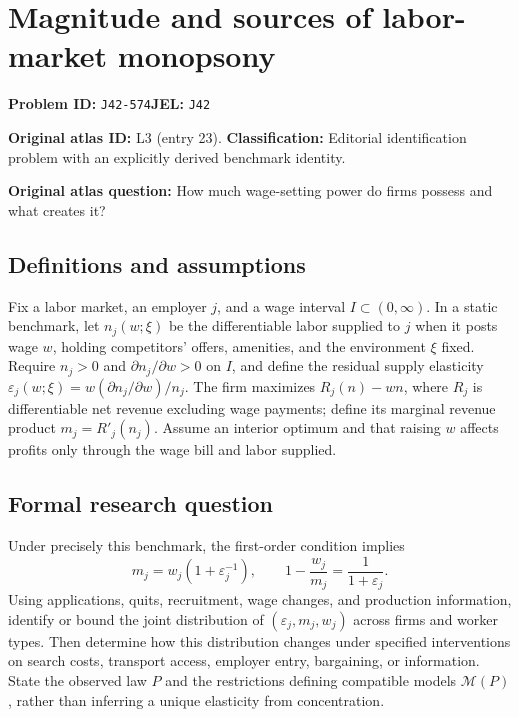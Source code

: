 \documentclass[11pt,a4paper]{article}
\begin{document}
\section*{Magnitude and sources of labor-market monopsony}
\textbf{Problem ID:} \texttt{J42-574}\quad \textbf{JEL:} \texttt{J42}\par
\label{problem:OP-0023}
\label{atlas:prob:L3}
\noindent\textbf{Original atlas ID:} L3 (entry 23). \textbf{Classification:} Editorial identification problem with an explicitly derived benchmark identity.

\noindent\textbf{Original atlas question:} How much wage-setting power do firms possess and what creates it?

\subsection*{Definitions and assumptions}
Fix a labor market, an employer $j$, and a wage interval $I\subset(0,\infty)$. In a static benchmark, let $n_j(w;\xi)$ be the differentiable labor supplied to $j$ when it posts wage $w$, holding competitors' offers, amenities, and the environment $\xi$ fixed. Require $n_j>0$ and $\partial n_j/\partial w>0$ on $I$, and define the residual supply elasticity $\varepsilon_j(w;\xi)=w(\partial n_j/\partial w)/n_j$. The firm maximizes $R_j(n)-wn$, where $R_j$ is differentiable net revenue excluding wage payments; define its marginal revenue product $m_j=R'_j(n_j)$. Assume an interior optimum and that raising $w$ affects profits only through the wage bill and labor supplied.
\subsection*{Formal research question}
Under precisely this benchmark, the first-order condition implies
\[
 m_j=w_j\left(1+\varepsilon_j^{-1}\right),
 \qquad 1-\frac{w_j}{m_j}=\frac{1}{1+\varepsilon_j}.
\]
Using applications, quits, recruitment, wage changes, and production information, identify or bound the joint distribution of $(\varepsilon_j,m_j,w_j)$ across firms and worker types. Then determine how this distribution changes under specified interventions on search costs, transport access, employer entry, bargaining, or information. State the observed law $P$ and the restrictions defining compatible models $\mathcal M(P)$, rather than inferring a unique elasticity from concentration.
\end{document}
